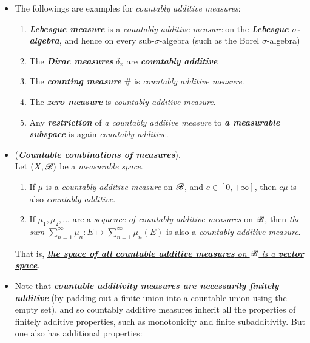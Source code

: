 \documentclass[11pt]{article}
\begin{document}
\begin{itemize}
\item \begin{example}
The followings are examples for \emph{countably additive measures}:
\begin{enumerate}
\item \emph{\textbf{Lebesgue measure}} is a \emph{countably additive measure} on the \emph{\textbf{Lebesgue $\sigma$-algebra}}, and hence on every sub-$\sigma$-algebra (such as the Borel $\sigma$-algebra)

\item The \emph{\textbf{Dirac measures}} $\delta_x$ are \emph{\textbf{countably additive}} 

\item The \emph{\textbf{counting measure}} $\#$ is \emph{countably additive measure}.

\item The \emph{\textbf{zero measure}} is \textit{countably additive measure}.

\item Any \emph{\textbf{restriction}} of \emph{a countably additive measure} to \emph{\textbf{a measurable subspace}} is again \emph{countably additive}.
\end{enumerate}
\end{example}

\item \begin{example} (\emph{\textbf{Countable combinations of measures}}). \\
Let $(X, {\mathscr B})$ be a \emph{measurable space}.
\begin{enumerate}
\item If $\mu$ is a \emph{countably additive measure} on ${\mathscr B}$, and $c \in [0, +\infty]$, then $c\mu$ is also \emph{countably additive}.

\item If $\mu_1, \mu_2, \ldots$ are a \emph{sequence of countably additive measures} on ${\mathscr B}$, then \emph{the sum} $\sum_{n=1}^{\infty}\mu_n: E \mapsto \sum_{n=1}^{\infty}\mu_n(E)$ is also a \emph{countably additive measure}.
\end{enumerate}
That is, \underline{\emph{\textbf{the space of all countable additive measures} on ${\mathscr B}$ is a \textbf{vector space}}}.
\end{example}

\item \begin{remark}
Note that \emph{\textbf{countable additivity measures are necessarily finitely additive}} (by padding out a finite union into a countable union using the empty set), and so countably additive measures inherit all the properties of finitely additive properties, such as monotonicity and finite subadditivity. But one also has additional properties:
\end{remark}


\end{itemize}
\end{document}
